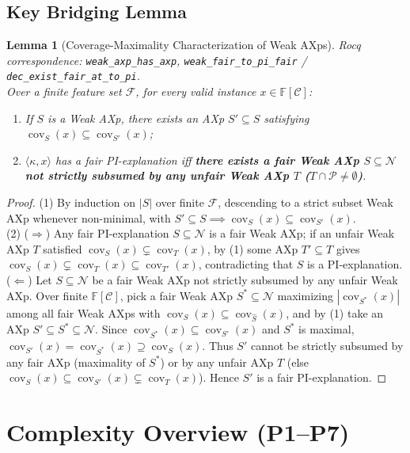 \documentclass[11pt,a4paper]{article}
\newtheorem{lemma}[theorem]{Lemma}
\newcommand{\F}{\mathbb{F}}
\newcommand{\C}{\mathcal{C}}
\newcommand{\N}{\mathcal{N}}
\newcommand{\Prot}{\mathcal{P}}
\newcommand{\cov}{\operatorname{cov}}
\newcommand{\code}[1]{\texttt{\small #1}}
\begin{document}
\subsection{Key Bridging Lemma}
\begin{lemma}[Coverage-Maximality Characterization of Weak AXps]
\noindent\emph{Rocq correspondence: \code{weak\_axp\_has\_axp}, \code{weak\_fair\_to\_pi\_fair} / \code{dec\_exist\_fair\_at\_to\_pi}}.\\
Over a finite feature set $\mathcal{F}$, for every valid instance $x \in \F[\C]$:
\begin{enumerate}
  \item If $S$ is a Weak AXp, there exists an AXp $S' \subseteq S$ satisfying $\cov_S(x) \subseteq \cov_{S'}(x)$;
  \item $\langle \kappa, x \rangle$ has a fair PI-explanation iff \textbf{there exists a fair Weak AXp $S \subseteq \N$ not strictly subsumed by any unfair Weak AXp $T$ ($T \cap \Prot \neq \emptyset$)}.
\end{enumerate}
\end{lemma}
\begin{proof}
(1) By induction on $|S|$ over finite $\mathcal{F}$, descending to a strict subset Weak AXp whenever non-minimal, with $S' \subseteq S \implies \cov_S(x) \subseteq \cov_{S'}(x)$.\\
(2) ($\Rightarrow$) Any fair PI-explanation $S \subseteq \N$ is a fair Weak AXp; if an unfair Weak AXp $T$ satisfied $\cov_S(x) \subsetneq \cov_T(x)$, by (1) some AXp $T' \subseteq T$ gives $\cov_S(x) \subsetneq \cov_T(x) \subseteq \cov_{T'}(x)$, contradicting that $S$ is a PI-explanation.\\
($\Leftarrow$) Let $S \subseteq \N$ be a fair Weak AXp not strictly subsumed by any unfair Weak AXp. Over finite $\F[\C]$, pick a fair Weak AXp $S^* \subseteq \N$ maximizing $|\cov_{S^*}(x)|$ among all fair Weak AXps with $\cov_S(x) \subseteq \cov_{\hat{S}}(x)$, and by (1) take an AXp $S' \subseteq S^* \subseteq \N$. Since $\cov_{S^*}(x) \subseteq \cov_{S'}(x)$ and $S^*$ is maximal, $\cov_{S'}(x) = \cov_{S^*}(x) \supseteq \cov_S(x)$. Thus $S'$ cannot be strictly subsumed by any fair AXp (maximality of $S^*$) or by any unfair AXp $T$ (else $\cov_S(x) \subseteq \cov_{S'}(x) \subsetneq \cov_T(x)$). Hence $S'$ is a fair PI-explanation.
\end{proof}

\section{Complexity Overview (P1--P7)}
\end{document}
